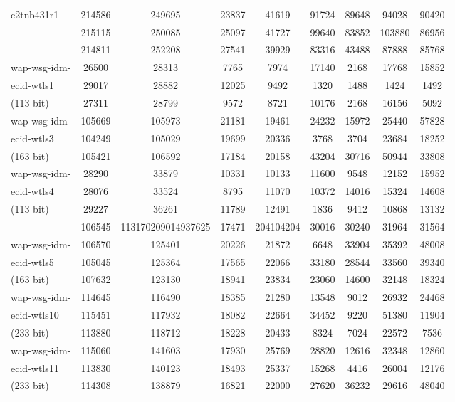 \documentclass[a4paper]{article}
\begin{document}
\begin{center}
\begin{longtable}{ |l|c|c|c|c|c|c|c|c| }
c2tnb431r1 & 214586 & 249695 & 23837 & 41619 & 91724 & 89648 & 94028 & 90420 \\ 
& 215115 & 250085 & 25097 & 41727 & 99640 & 83852 & 103880 & 86956 \\ 
& 214811 & 252208 & 27541 & 39929 & 83316 & 43488 & 87888 & 85768 \\ \hline

wap-wsg-idm- & 26500 & 28313 & 7765 & 7974 & 17140 & 2168 & 17768 & 15852 \\ 
ecid-wtls1 & 29017 & 28882 & 12025 & 9492 & 1320 & 1488 & 1424 & 1492 \\ 
(113 bit) & 27311 & 28799 & 9572 & 8721 & 10176 & 2168 & 16156 & 5092 \\ \hline

wap-wsg-idm- & 105669 & 105973 & 21181 & 19461 & 24232 & 15972 & 25440 & 57828 \\
ecid-wtls3 & 104249 & 105029 & 19699 & 20336 & 3768 & 3704 & 23684 & 18252 \\ 
(163 bit) & 105421 & 106592 & 17184 & 20158 & 43204 & 30716 & 50944 & 33808 \\ \hline

wap-wsg-idm- & 28290 & 33879 & 10331 & 10133 & 11600 & 9548 & 12152 & 15952 \\
ecid-wtls4 & 28076 & 33524 & 8795 & 11070 & 10372 & 14016 & 15324 & 14608 \\ 
(113 bit) & 29227 & 36261 & 11789 & 12491 & 1836 & 9412 & 10868 & 13132 \\ \hline

& 106545 & 113170209014937625 & 17471 & 204104204 & 30016 & 30240 & 31964 & 31564 \\
wap-wsg-idm- & 106570 & 125401 & 20226 & 21872 & 6648 & 33904 & 35392 & 48008 \\ 
ecid-wtls5 & 105045 & 125364 & 17565 & 22066 & 33180 & 28544 & 33560 & 39340 \\ 
(163 bit) & 107632 & 123130 & 18941 & 23834 & 23060 & 14600 & 32148 & 18324 \\ \hline

wap-wsg-idm- & 114645 & 116490 & 18385 & 21280 & 13548 & 9012 & 26932 & 24468 \\ 
ecid-wtls10 & 115451 & 117932 & 18082 & 22664 & 34452 & 9220 & 51380 & 11904 \\
(233 bit) & 113880 & 118712 & 18228 & 20433 & 8324 & 7024 & 22572 & 7536 \\ \hline

wap-wsg-idm- & 115060 & 141603 & 17930 & 25769 & 28820 & 12616 & 32348 & 12860 \\ 
ecid-wtls11 & 113830 & 140123 & 18493 & 25337 & 15268 & 4416 & 26004 & 12176 \\
(233 bit) & 114308 & 138879 & 16821 & 22000 & 27620 & 36232 & 29616 & 48040 \\ \hline

    \end{longtable}
\end{center}
   	
\end{document}
